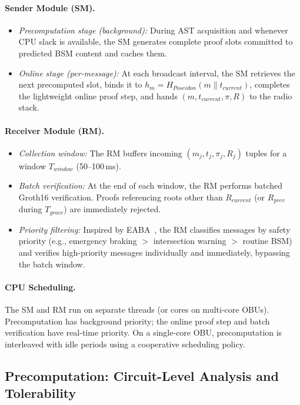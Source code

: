 \paragraph{Sender Module (SM).}
\begin{itemize}
    \item \emph{Precomputation stage (background):} During AST acquisition and
    whenever CPU slack is available, the SM generates complete proof slots
    committed to predicted BSM content and caches them.
    \item \emph{Online stage (per-message):} At each broadcast interval, the SM
    retrieves the next precomputed slot, binds it to
    $h_m = H_{Poseidon}(m \| t_{current})$, completes the lightweight online proof
    step, and hands $(m, t_{current}, \pi, R)$ to the radio stack.
\end{itemize}

\paragraph{Receiver Module (RM).}
\begin{itemize}
    \item \emph{Collection window:} The RM buffers incoming
    $(m_j, t_j, \pi_j, R_j)$ tuples for a window $T_{window}$ (50--100\,ms).
    \item \emph{Batch verification:} At the end of each window, the RM performs
    batched Groth16 verification. Proofs referencing roots other than $R_{current}$
    (or $R_{prev}$ during $T_{grace}$) are immediately rejected.
    \item \emph{Priority filtering:} Inspired by EABA~\cite{zheng2018eaba}, the RM
    classifies messages by safety priority (e.g., emergency braking $>$ intersection
    warning $>$ routine BSM) and verifies high-priority messages individually and
    immediately, bypassing the batch window.
\end{itemize}

\paragraph{CPU Scheduling.}
The SM and RM run on separate threads (or cores on multi-core OBUs). Precomputation
has background priority; the online proof step and batch verification have real-time
priority. On a single-core OBU, precomputation is interleaved with idle periods
using a cooperative scheduling policy.

\subsection{Precomputation: Circuit-Level Analysis and Tolerability}
\label{sec:precomp_overhead}

